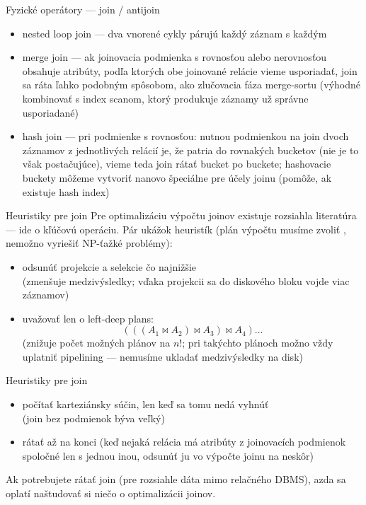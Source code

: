 \documentclass[12pt]{beamer}
\DeclareMathOperator{\join}{\bowtie}
\begin{document}
\begin{frame}[fragile]{Fyzické operátory --- join / antijoin}
\begin{itemize}
\item \alert{nested loop join} --- dva vnorené cykly párujú každý záznam s každým
\item \alert{merge join} --- ak joinovacia podmienka s rovnosťou alebo nerovnosťou obsahuje atribúty,
    podľa ktorých obe joinované relácie vieme usporiadať, join sa ráta ľahko podobným spôsobom,
    ako zlučovacia fáza merge-sortu
    (výhodné kombinovať s index scanom, ktorý produkuje záznamy už správne usporiadané)
\item \alert{hash join} --- pri podmienke s rovnosťou: nutnou podmienkou na join
    dvoch záznamov z jednotlivých relácií je, že patria do rovnakých bucketov
    (nie je to však postačujúce), vieme teda join rátať bucket po buckete;
    hashovacie buckety môžeme vytvoriť nanovo špeciálne pre účely joinu
    (pomôže, ak existuje hash index)
\end{itemize}
\end{frame}

\begin{frame}[fragile]{Heuristiky pre join}
Pre optimalizáciu výpočtu joinov existuje rozsiahla literatúra --- ide o kľúčovú operáciu.
Pár ukážok heuristík (plán výpočtu musíme zvoliť , nemožno vyriešiť NP-ťažké problémy):
\begin{itemize}
  \item odsunúť projekcie a selekcie čo najnižšie\\(zmenšuje medzivýsledky; vďaka projekcii sa do diskového bloku vojde viac záznamov)
  \item uvažovať len o left-deep plans:
    $$(((A_1\join A_2)\join A_3)\join A_4)\dots$$
    (znižuje počet možných plánov na $n!$; pri takýchto plánoch možno vždy uplatniť pipelining --- nemusíme ukladať medzivýsledky na disk)
\end{itemize}
\end{frame}

\begin{frame}[fragile]{Heuristiky pre join}
\begin{itemize}
  \item počítať karteziánsky súčin, len keď sa tomu nedá vyhnúť\\
    (join bez podmienok býva veľký)
  \item {} rátať až na konci (keď nejaká relácia má atribúty z joinovacích podmienok spoločné len s jednou inou, odsunúť ju vo výpočte joinu na neskôr)
\end{itemize}
Ak potrebujete rátať join  (pre rozsiahle dáta mimo relačného DBMS), azda sa oplatí naštudovať si niečo o optimalizácii joinov.
\end{frame}
\end{document}
